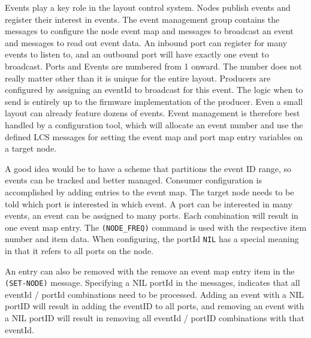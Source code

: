 
Events play a key role in the layout control system. Nodes publish events and register their interest in events. The event management group contains the messages to configure the node event map and messages to broadcast an event and messages to read out event data. An inbound port can register for many events to listen to, and an outbound port will have exactly one event to broadcast. Ports and Events are numbered from 1 onward. The number does not really matter other than it is unique for the entire layout. Producers are configured by assigning an eventId to broadcast for this event. The logic when to send is entirely up to the firmware implementation of the producer. Even a small layout can already feature dozens of events. Event management is therefore best handled by a configuration tool, which will allocate an event number and use the defined LCS messages for setting the event map and port map entry variables on a target node.

A good idea would be to have a scheme that partitions the event ID range, so events can be tracked and better managed. Consumer configuration is accomplished by adding entries to the event map. The target node needs to be told which port is interested in which event. A port can be interested in many events, an event can be assigned to many ports. Each combination will result in one event map entry. The \texttt{(NODE\_FREQ)} command is used with the respective item number and item data. When configuring, the portId \texttt{NIL} has a special meaning in that it refers to all ports on the node.

\begin{table}[ht!]
    \centering 
\end{table}

An entry can also be removed with the remove an event map entry item in the \texttt{(SET-NODE)} message. Specifying a NIL portId in the messages, indicates that all eventId / portId combinations need to be processed. Adding an event with a NIL portID will result in adding the eventID to all ports, and removing an event with a NIL portID will result in removing all eventId / portID combinations with that eventId.

